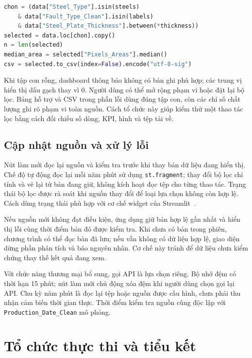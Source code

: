 \documentclass[12pt,a4paper,oneside]{report}
\newcommand{\maCot}[1]{{\urlstyle{tt}\def\UrlBreaks{\do\_\do\/\do\.}\def\UrlBigBreaks{}\nolinkurl{#1}}}
\begin{document}
\noindent\begin{minipage}{\linewidth}
\begin{lstlisting}[language=Python]
chon = (data["Steel_Type"].isin(steels)
    & data["Fault_Type_Clean"].isin(labels)
    & data["Steel_Plate_Thickness"].between(*thickness))
selected = data.loc[chon].copy()
n = len(selected)
median_area = selected["Pixels_Areas"].median()
csv = selected.to_csv(index=False).encode("utf-8-sig")
\end{lstlisting}
\end{minipage}\par

Khi tập con rỗng, dashboard thông báo không có bản ghi phù hợp; các trung vị hiển thị dấu gạch thay vì 0. Người dùng có thể mở rộng phạm vi hoặc đặt lại bộ lọc. Bảng hỗ trợ và CSV trong phần lỗi dùng đúng tập con, còn các chỉ số chất lượng ghi rõ phạm vi toàn nguồn. Cách tổ chức này giúp kiểm thử một thao tác lọc bằng cách đối chiếu số dòng, KPI, hình và tệp tải về.

\subsection{Cập nhật nguồn và xử lý lỗi}

Nút làm mới đọc lại nguồn và kiểm tra trước khi thay bản dữ liệu đang hiển thị. Chế độ tự động đọc lại mỗi năm phút sử dụng \maCot{st.fragment}; thay đổi bộ lọc chỉ tính và vẽ lại từ bản đang giữ, không kích hoạt đọc tệp cho từng thao tác. Trạng thái bộ lọc được rà soát khi nguồn thay đổi để loại lựa chọn không còn hợp lệ. Cách dùng trạng thái phù hợp với cơ chế widget của Streamlit~\cite{streamlit}.

Nếu nguồn mới không đạt điều kiện, ứng dụng giữ bản hợp lệ gần nhất và hiển thị lỗi cùng thời điểm bản đó được kiểm tra. Khi chưa có bản trong phiên, chương trình có thể đọc bản đã lưu; nếu vẫn không có dữ liệu hợp lệ, giao diện dừng phần phân tích và báo nguyên nhân. Cơ chế này tránh để dữ liệu chưa kiểm chứng thay thế kết quả đang xem.

Với chức năng thương mại bổ sung, gọi API là lựa chọn riêng. Bộ nhớ đệm có thời hạn 15 phút; nút làm mới chủ động xóa đệm khi người dùng chọn gọi lại API. Chu kỳ năm phút là đọc lại tệp hoặc nguồn được cấu hình, chưa phải thu nhận cảm biến thời gian thực. Thời điểm kiểm tra nguồn cũng độc lập với \maCot{Production_Date_Clean} mô phỏng.

\section{Tổ chức thực thi và tiểu kết}
\end{document}
